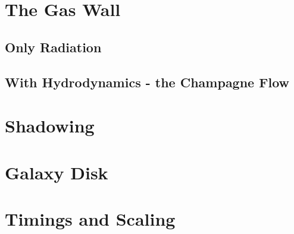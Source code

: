\section{The Gas Wall}
\label{sec:gaswall}



\subsection{Only Radiation}
\label{sec:gaswallradonly}



\subsection{With Hydrodynamics - the Champagne Flow}
\label{sec:champagne}



\section{Shadowing}
\label{sec:shadowing}



\section{Galaxy Disk}
\label{sec:galaxydisk}



\section{Timings and Scaling}
\label{sec:timing}



